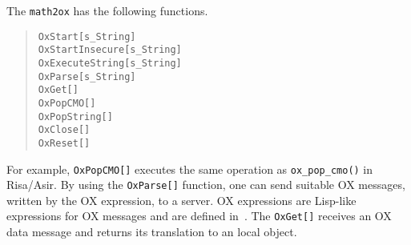 The {\tt math2ox} has the following functions.
\begin{quote}
{\tt OxStart[s\_String]} \\
{\tt OxStartInsecure[s\_String]} \\
{\tt OxExecuteString[s\_String]}  \\
{\tt OxParse[s\_String]} \\
{\tt OxGet[]} \\
{\tt OxPopCMO[]} \\
{\tt OxPopString[]} \\
{\tt OxClose[]} \\
{\tt OxReset[]}
\end{quote}
For example, {\tt OxPopCMO[]} executes the same operation
as {\tt ox\_pop\_cmo()} in Risa/Asir.
By using the {\tt OxParse[]} function, one can send suitable OX messages,
written by the OX expression, to a server. OX expressions are
Lisp-like expressions for OX messages and are defined
in~\cite{noro-takayama}.  
The {\tt OxGet[]} receives an OX data message
and returns its translation to an local object.
